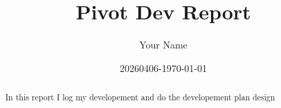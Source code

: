 \documentclass{article}
\title{Pivot Dev Report}
\author{Your Name}
\date{20260406-\today}
\begin{document}
\maketitle

\begin{abstract}
    In this report I log my developement and
    do the developement plan design
\end{abstract}

\tableofcontents
\newpage


\end{document}
